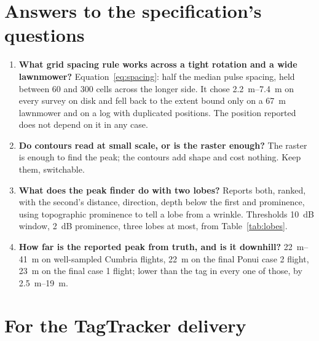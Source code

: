 \documentclass[11pt,a4paper]{article}
\begin{document}
\begin{table}[htbp]
\centering\footnotesize

\caption{Number of lobes each case reports as the window $W$ / prominence floor $P$ (dB)
vary, uncapped. The defaults are $10/2$.}
\label{tab:lobes}
\end{table}

\section{Answers to the specification's questions}
\label{sec:answers}

\begin{enumerate}
\item \textbf{What grid spacing rule works across a tight rotation and a wide lawnmower?}
Equation~\eqref{eq:spacing}: half the median pulse spacing, held between 60 and 300 cells
across the longer side. It chose \SIrange{2.2}{7.4}{m} on every survey on disk and fell back to
the extent bound only on a \SI{67}{m} lawnmower and on a log with duplicated positions. The
position reported does not depend on it in any case.
\item \textbf{Do contours read at small scale, or is the raster enough?} The raster is
enough to find the peak; the contours add shape and cost nothing. Keep them, switchable.
\item \textbf{What does the peak finder do with two lobes?} Reports both, ranked, with the
second's distance, direction, depth below the first and prominence, using topographic
prominence to tell a lobe from a wrinkle. Thresholds \SI{10}{dB} window, \SI{2}{dB} prominence,
three lobes at most, from Table~\ref{tab:lobes}.
\item \textbf{How far is the reported peak from truth, and is it downhill?}
\SIrange{22}{41}{m} on well-sampled Cumbria flights, \SI{22}{m} on the final Ponui case 2
flight, \SI{23}{m} on the final case 1 flight; lower than the tag in every one of those, by
\SIrange{2.5}{19}{m}.
\end{enumerate}

\section{For the TagTracker delivery}
\end{document}
